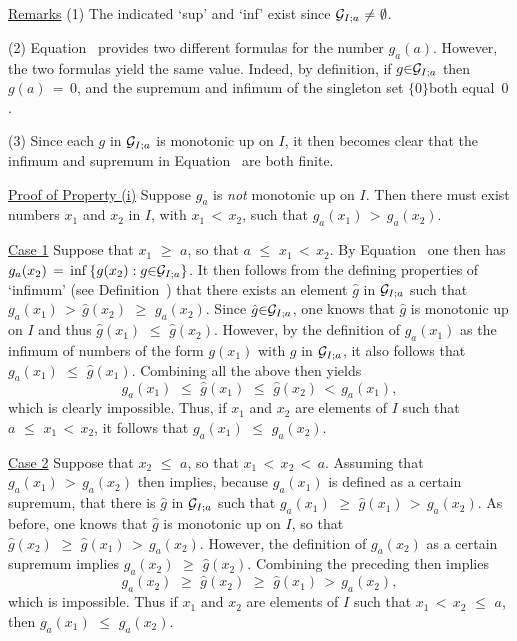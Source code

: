         \underline{Remarks} (1) The indicated `sup' and `inf' exist since ${\cal G}_{I;a} \,\,{\neq}\,\, {\emptyset}$.

        (2) Equation~ provides two different formulas for the number $g_{a}(a)$.
    However, the two formulas yield the same value. Indeed, by definition, if $g{\in}{\cal G}_{I;a}$ then $g(a) \,=\, 0$, and the supremum and infimum of the singleton set $\{0\}$both equal~$0$.

        (3) Since each $g$ in ${\cal G}_{I;a}$ is monotonic up on $I$,
    it then becomes clear that the infimum and supremum in Equation~ are both finite.

\V

        \underline{Proof of Property (i)} Suppose $g_{a}$ is {\em not} monotonic up on $I$.
    Then there must exist numbers $x_{1}$ and $x_{2}$ in $I$, with $x_{1}\,<\,x_{2}$,
    such that $g_{a}(x_{1})\,>\,g_{a}(x_{2})$.

        \underline{Case 1} Suppose that $x_{1}\,\,{\geq}\,\,a$, so that $a\,\,{\leq}\,\,x_{1}\,<\,x_{2}$.
    By Equation~ one then has $g_{a}(x_{2}) \,=\, {\inf}\,\{g(x_{2}):g{\in}{\cal G}_{I;a}\}$.
    It then follows from the defining properties of `infimum' (see Definition~) that there exists an element $\hat{g}$ in ${\cal G}_{I;a}$ such that $g_{a}(x_{1})\,>\,\hat{g}(x_{2})\,\,{\geq}\,\,g_{a}(x_{2})$.
    Since $\hat{g}{\in}{\cal G}_{I;a}$, one knows that $\hat{g}$ is monotonic up on $I$ and thus $\hat{g}(x_{1})\,\,{\leq}\,\,\hat{g}(x_{2})$.
    However, by the definition of $g_{a}(x_{1})$ as the infimum of numbers of the form $g(x_{1})$ with $g$ in ${\cal G}_{I;a}$,
    it also follows that $g_{a}(x_{1})\,\,{\leq}\,\,\hat{g}(x_{1})$.
    Combining all the above then yields
        \begin{displaymath}
g_{a}(x_{1})\,\,{\leq}\,\,\hat{g}(x_{1})\,\,{\leq}\,\,\hat{g}(x_{2})\,<\,g_{a}(x_{1}),
        \end{displaymath}
    which is clearly impossible. Thus, if $x_{1}$ and $x_{2}$ are elements of $I$ such that $a\,\,{\leq}\,\,x_{1}\,<\,x_{2}$, it follows that $g_{a}(x_{1})\,\,{\leq}\,\,g_{a}(x_{2})$.

        \underline{Case 2} Suppose that $x_{2}\,\,{\leq}\,\,a$, so that $x_{1}\,<\,x_{2}\,<\,a$.
    Assuming that $g_{a}(x_{1})\,>\,g_{a}(x_{2})$ then implies, because $g_{a}(x_{1})$ is defined as a certain supremum,
    that there is $\hat{g}$ in ${\cal G}_{I;a}$ such that $g_{a}(x_{1})\,\,{\geq}\,\,\hat{g}(x_{1})\,>\,g_{a}(x_{2})$.
    As before, one knows that $\hat{g}$ is monotonic up on $I$, so that $\hat{g}(x_{2})\,\,{\geq}\,\,\hat{g}(x_{1})\,>\,g_{a}(x_{2})$.
    However, the definition of $g_{a}(x_{2})$ as a certain supremum implies $g_{a}(x_{2})\,\,{\geq}\,\,\hat{g}(x_{2})$.
    Combining the preceding then implies
        \begin{displaymath}
        g_{a}(x_{2})\,\,{\geq}\,\,\hat{g}(x_{2})\,\,{\geq}\,\,\hat{g}(x_{1})\,>\,g_{a}(x_{2}),
        \end{displaymath}
    which is impossible. Thus if $x_{1}$ and $x_{2}$ are elements of $I$ such that $x_{1}\,<\,x_{2}\,\,{\leq}\,\,a$, then $g_{a}(x_{1})\,\,{\leq}\,\,g_{a}(x_{2})$.

